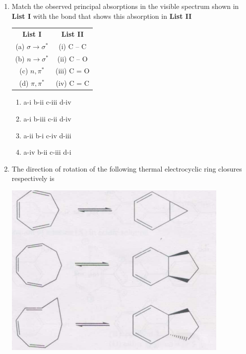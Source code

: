 \documentclass[journal,12pt,onecolumn]{IEEEtran}
\theoremstyle{remark}
\begin{document}
\begin{enumerate}
\item  Match the observed principal absorptions in the visible spectrum shown in \textbf{List I} with the bond that shows this absorption in \textbf{List II} \hfill{}

\begin{center}
\begin{tabular}{c@{\hspace{3cm}}c}
\textbf{List I} & \textbf{List II} \\
(a) $\sigma \rightarrow \sigma^*$ & (i) C -- C \\
(b) $n \rightarrow \sigma^*$ & (ii) C -- O \\
(c) $n, \pi^*$ & (iii) C = O \\
(d) $\pi, \pi^*$ & (iv) C = C \\
\end{tabular}
\end{center}

\begin{multicols}{2}
\begin{enumerate}
     \item   a-i \quad b-ii \quad c-iii \quad d-iv
     \item   a-i \quad b-iii \quad c-ii \quad d-iv
     \item   a-ii \quad b-i \quad c-iv \quad d-iii
     \item   a-iv \quad b-ii \quad c-iii \quad d-i
\end{enumerate}
\end{multicols}
   

\item  The direction of rotation of the following thermal electrocyclic ring closures respectively is \hfill{}

\includegraphics[scale=1.5]{figs/image8.png}



\end{enumerate}
\end{document}
